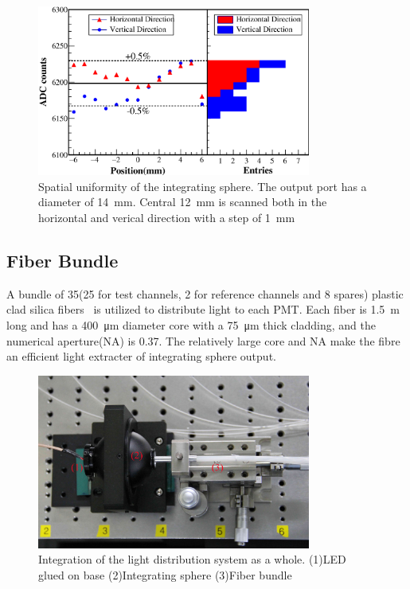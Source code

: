 \documentclass[review, times]{elsarticle}
\begin{document}
\begin{figure}
 \centering
 \includegraphics[width=90mm]{uniformity_integratingsphere}
\caption{Spatial uniformity of the integrating sphere.
The output port has a diameter of \SI{14}{\milli\meter}.
Central \SI{12}{\milli\meter} is scanned both in the horizontal and verical direction with a step of \SI{1}{\milli\meter}}
\label{fig:uniformity_integratingsphere}
\end{figure} 

\subsection{Fiber Bundle}
\label{sec:fiber_bundle}

A bundle of 35(25 for test channels, 2 for reference channels and 8 spares) plastic clad silica fibers~\cite{optical_fibre} is utilized to distribute light to each PMT.
Each fiber is \SI{1.5}{\meter} long and has a \SI{400}{\micro\meter} diameter core with a \SI{75}{\micro\meter} thick cladding, and the numerical aperture(NA) is 0.37.
The relatively large core and NA make the fibre an efficient light extracter of integrating sphere output. 

\begin{figure}
 \centering
 \includegraphics[width=90mm]{light_dist_label}
\caption{Integration of the light distribution system as a whole.
(1)LED glued on base (2)Integrating sphere (3)Fiber bundle}
\label{fig:light_source}
\end{figure} 
\end{document}

